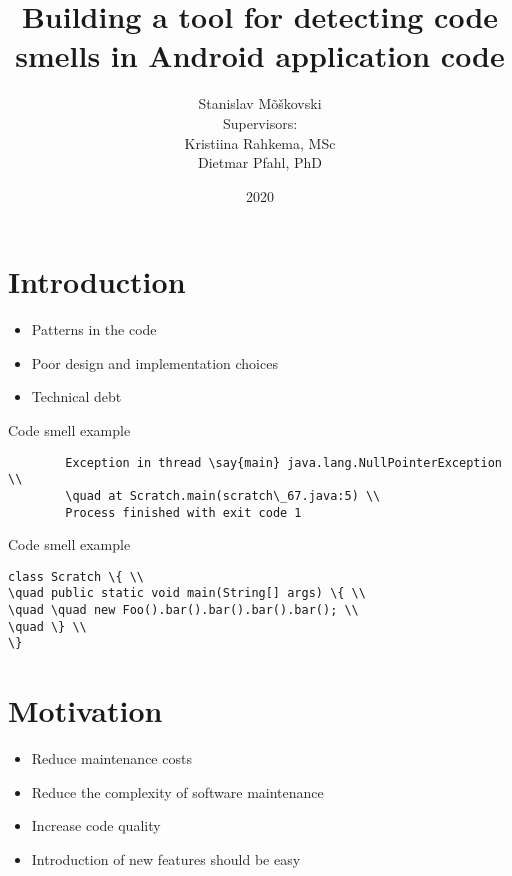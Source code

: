 \documentclass{beamer}
\title{Building a tool for detecting code smells in Android application code}
\author[Stanislav Mõškovski]{Stanislav Mõškovski\\ {\vspace{8mm}\small Supervisors: \\ Kristiina Rahkema, MSc \\Dietmar Pfahl, PhD}}
\institute{University of Tartu}
\date{2020}
\begin{document}
    \frame{\titlepage}

    \section{Introduction}\label{sec:introduction}
    \begin{frame}{\secname}
        \begin{itemize}
            \item Patterns in the code
            \item Poor design and implementation choices
            \item Technical debt
        \end{itemize}
    \end{frame}

    \begin{frame}{Code smell example}
        \begin{verbatim}
        Exception in thread \say{main} java.lang.NullPointerException \\
        \quad at Scratch.main(scratch\_67.java:5) \\
        Process finished with exit code 1
        \end{verbatim}
    \end{frame}

    \begin{frame}{Code smell example}
        \begin{verbatim}
class Scratch \{ \\
\quad public static void main(String[] args) \{ \\
\quad \quad new Foo().bar().bar().bar().bar(); \\
\quad \} \\
\}
        \end{verbatim}
    \end{frame}

    \section{Motivation}\label{sec:motivation}
    \begin{frame}{\secname}
        \begin{itemize}
            \item Reduce maintenance costs
            \item Reduce the complexity of software maintenance
            \item Increase code quality
            \item Introduction of new features should be easy
        \end{itemize}
    \end{frame}
\end{document}
